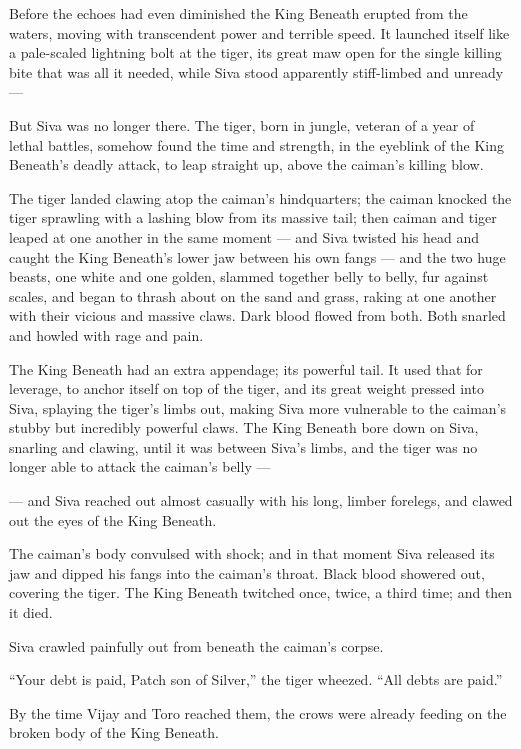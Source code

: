 \documentclass[12pt]{memoir}
\begin{document}
Before the echoes had even diminished the King Beneath erupted from
the waters, moving with transcendent power and terrible speed. It
launched itself like a pale-scaled lightning bolt at the tiger, its
great maw open for the single killing bite that was all it needed,
while Siva stood apparently stiff-limbed and unready —

But Siva was no longer there. The tiger, born in jungle, veteran of a
year of lethal battles, somehow found the time and strength, in the
eyeblink of the King Beneath’s deadly attack, to leap straight up,
above the caiman’s killing blow.

The tiger landed clawing atop the caiman’s hindquarters; the caiman
knocked the tiger sprawling with a lashing blow from its massive tail;
then caiman and tiger leaped at one another in the same moment — and
Siva twisted his head and caught the King Beneath’s lower jaw between
his own fangs — and the two huge beasts, one white and one golden,
slammed together belly to belly, fur against scales, and began to
thrash about on the sand and grass, raking at one another with their
vicious and massive claws. Dark blood flowed from both. Both snarled
and howled with rage and pain.

The King Beneath had an extra appendage; its powerful tail. It used
that for leverage, to anchor itself on top of the tiger, and its great
weight pressed into Siva, splaying the tiger’s limbs out, making Siva
more vulnerable to the caiman’s stubby but incredibly powerful
claws. The King Beneath bore down on Siva, snarling and clawing, until
it was between Siva’s limbs, and the tiger was no longer able to
attack the caiman’s belly —

— and Siva reached out almost casually with his long, limber forelegs,
and clawed out the eyes of the King Beneath.

The caiman’s body convulsed with shock; and in that moment Siva
released its jaw and dipped his fangs into the caiman’s throat. Black
blood showered out, covering the tiger. The King Beneath twitched
once, twice, a third time; and then it died.

Siva crawled painfully out from beneath the caiman’s corpse.

“Your debt is paid, Patch son of Silver,” the tiger wheezed. “All
debts are paid.”

By the time Vijay and Toro reached them, the crows were already
feeding on the broken body of the King Beneath.


\chapter{}
\end{document}

